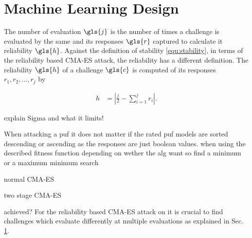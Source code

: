 \section{Machine Learning Design}
\label{sec:machinelearningdesign}



The number of evaluation $\gls{j}$ is the number of times a challenge is evaluated by the same \apuf and its responses $\gls{r}$ captured to calculate it reliability $\gls{h}$.
Against the definition of stability \ref{equ:stability}, in terms of the reliability based \ac{CMA-ES} attack, the reliability has a different definition.
The reliability $\gls{h}$ of a challenge $\gls{c}$ is computed of its responses $r_1, r_2, ..., r_j$ by

\begin{align}
h &= |\frac{j}{2} - \sum_{i = 1}^{j}r_i|. \label{equ:reliability}
\end{align}




explain Sigma and what it limits!

When attacking a puf it does not matter if the rated puf models are sorted descending or ascending as the responses are just boolean values.
when using the described fitness function
depending on wether the alg want so find a minimum or a maximum
minimum search


normal CMA-ES

two stage CMA-ES

achieved? For the reliability based \ac{CMA-ES} attack on \apufs it is crucial to find challenges which evaluate differently at multiple evaluations as explained in Sec. \ref{sec:machinelearningdesign}.

